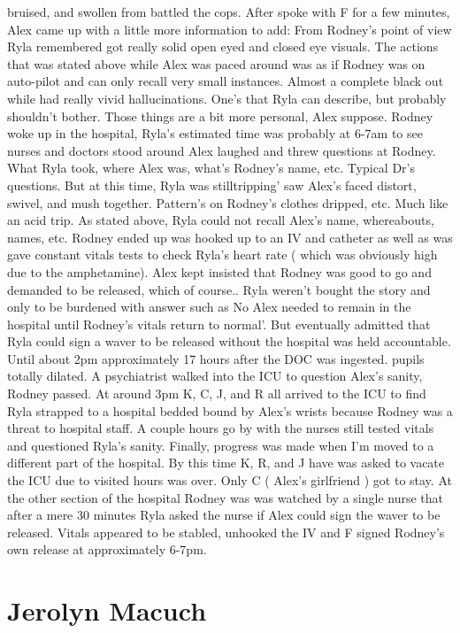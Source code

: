 \documentclass[12pt]{book}
\begin{document}
bruised, and swollen from battled the cops. After spoke with F for a few minutes, Alex came up with a little more information to add: From Rodney's point of view Ryla remembered got really solid open eyed and closed eye visuals. The actions that was stated above while Alex was paced around was as if Rodney was on auto-pilot and can only recall very small instances. Almost a complete black out while had really vivid hallucinations. One's that Ryla can describe, but probably shouldn't bother. Those things are a bit more personal, Alex suppose. Rodney woke up in the hospital, Ryla's estimated time was probably at 6-7am to see nurses and doctors stood around Alex laughed and threw questions at Rodney. What Ryla took, where Alex was, what's Rodney's name, etc. Typical Dr's questions. But at this time, Ryla was stilltripping' saw Alex's faced distort, swivel, and mush together. Pattern's on Rodney's clothes dripped, etc. Much like an acid trip. As stated above, Ryla could not recall Alex's name, whereabouts, names, etc. Rodney ended up was hooked up to an IV and catheter as well as was gave constant vitals tests to check Ryla's heart rate ( which was obviously high due to the amphetamine). Alex kept insisted that Rodney was good to go and demanded to be released, which of course.. Ryla weren't bought the story and only to be burdened with answer such as No Alex needed to remain in the hospital until Rodney's vitals return to normal'. But eventually admitted that Ryla could sign a waver to be released without the hospital was held accountable. Until about 2pm approximately 17 hours after the DOC was ingested. pupils totally dilated. A psychiatrist walked into the ICU to question Alex's sanity, Rodney passed. At around 3pm K, C, J, and R all arrived to the ICU to find Ryla strapped to a hospital bedded bound by Alex's wrists because Rodney was a threat to hospital staff. A couple hours go by with the nurses still tested vitals and questioned Ryla's sanity. Finally, progress was made when I'm moved to a different part of the hospital. By this time K, R, and J have was asked to vacate the ICU due to visited hours was over. Only C ( Alex's girlfriend ) got to stay. At the other section of the hospital Rodney was was watched by a single nurse that after a mere 30 minutes Ryla asked the nurse if Alex could sign the waver to be released. Vitals appeared to be stabled, unhooked the IV and F signed Rodney's own release at approximately 6-7pm.



\chapter{Jerolyn Macuch}
\end{document}
